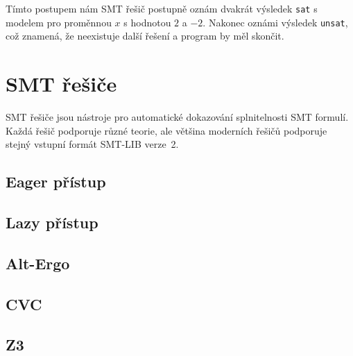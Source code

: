 Tímto postupem nám SMT řešič postupně oznám dvakrát výsledek \texttt{sat} s modelem pro proměnnou $x$ s hodnotou $2$ a $-2$.
Nakonec oznámi výsledek \texttt{unsat}, což znamená, že neexistuje další řešení a program by měl skončit.




\section{SMT řešiče}
\label{sec:smt-resice}

SMT řešiče jsou nástroje pro automatické dokazování splnitelnosti SMT formulí.
Každá řešič podporuje různé teorie, ale většina moderních řešičů podporuje stejný vstupní formát SMT-LIB verze~2.

\subsection{Eager přístup}

\subsection{Lazy přístup}

\subsection{Alt-Ergo}
\label{subsec:alt-ergo}

\subsection{CVC}
\label{subsec:cvc}

\subsection{Z3}
\label{subsec:z3}